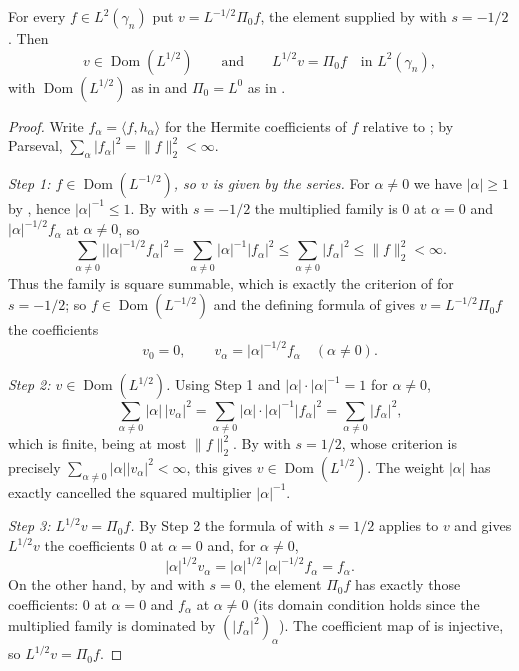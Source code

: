 \begin{lemma}
For every $f \in L^2(\gamma_n)$ put $v = L^{-1/2}\Pi_0 f$, the element supplied by
 with $s = -1/2$.  Then
\[
  v \in \operatorname{Dom}(L^{1/2})
  \qquad\text{and}\qquad
  L^{1/2} v = \Pi_0 f \quad\text{in } L^2(\gamma_n),
\]
with $\operatorname{Dom}(L^{1/2})$ as in  and
$\Pi_0 = L^0$ as in .
\end{lemma}
\begin{proof}
Write $f_\alpha = \langle f, h_\alpha\rangle$ for the Hermite coefficients of $f$
relative to ; by Parseval,
$\sum_\alpha |f_\alpha|^2 = \|f\|_2^2 < \infty$.

\emph{Step 1: $f \in \operatorname{Dom}(L^{-1/2})$, so $v$ is given by the series.}
For $\alpha \neq 0$ we have $|\alpha| \geq 1$ by , hence
$|\alpha|^{-1} \leq 1$.  By  with $s = -1/2$ the multiplied
family is $0$ at $\alpha = 0$ and $|\alpha|^{-1/2}f_\alpha$ at $\alpha \neq 0$, so
\[
  \sum_{\alpha \neq 0}\bigl||\alpha|^{-1/2}f_\alpha\bigr|^2
    = \sum_{\alpha \neq 0}|\alpha|^{-1}|f_\alpha|^2
    \leq \sum_{\alpha \neq 0}|f_\alpha|^2 \leq \|f\|_2^2 < \infty .
\]
Thus the family is square summable, which is exactly the criterion of
 for $s = -1/2$; so $f \in \operatorname{Dom}(L^{-1/2})$ and
the defining formula of  gives $v = L^{-1/2}\Pi_0 f$ the
coefficients
\[
  v_0 = 0,
  \qquad
  v_\alpha = |\alpha|^{-1/2} f_\alpha \quad (\alpha \neq 0).
\]

\emph{Step 2: $v \in \operatorname{Dom}(L^{1/2})$.}
Using Step 1 and $|\alpha|\cdot|\alpha|^{-1} = 1$ for $\alpha \neq 0$,
\[
  \sum_{\alpha \neq 0} |\alpha|\, |v_\alpha|^2
    = \sum_{\alpha \neq 0} |\alpha|\cdot|\alpha|^{-1}|f_\alpha|^2
    = \sum_{\alpha \neq 0} |f_\alpha|^2 ,
\]
which is finite, being at most $\|f\|_2^2$.  By  with
$s = 1/2$, whose criterion is precisely
$\sum_{\alpha\neq0}|\alpha||v_\alpha|^2 < \infty$, this gives
$v \in \operatorname{Dom}(L^{1/2})$.  The weight $|\alpha|$ has exactly cancelled
the squared multiplier $|\alpha|^{-1}$.

\emph{Step 3: $L^{1/2}v = \Pi_0 f$.}
By Step 2 the formula of  with $s = 1/2$ applies to $v$ and gives
$L^{1/2}v$ the coefficients $0$ at $\alpha = 0$ and, for $\alpha \neq 0$,
\[
  |\alpha|^{1/2} v_\alpha
    = |\alpha|^{1/2}\,|\alpha|^{-1/2} f_\alpha = f_\alpha .
\]
On the other hand, by  and  with $s = 0$,
the element $\Pi_0 f$ has exactly those coefficients: $0$ at $\alpha = 0$ and
$f_\alpha$ at $\alpha \neq 0$ (its domain condition holds since the multiplied
family is dominated by $(|f_\alpha|^2)_\alpha$).  The coefficient map of
 is injective, so $L^{1/2}v = \Pi_0 f$.

\end{proof}
